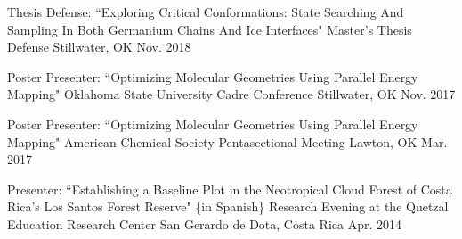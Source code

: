 

\begin{cventries}

  \cventry
    {Thesis Defense: ``Exploring Critical Conformations: State Searching And Sampling In Both Germanium Chains And Ice Interfaces"} %
    {Master's Thesis Defense} %
    {Stillwater, OK} %
    {Nov. 2018} %
    {
      \begin{cvitems} %
      \end{cvitems}
    }
	\vspace{-7.0mm}

\cventry
{Poster Presenter: ``Optimizing Molecular Geometries Using Parallel Energy Mapping"} %
{Oklahoma State University Cadre Conference} %
{Stillwater, OK} %
{Nov. 2017} %
{
	\begin{cvitems} %
	\end{cvitems}
}
\vspace{-7.0mm}

 \cventry
	{Poster Presenter: ``Optimizing Molecular Geometries Using Parallel Energy Mapping"} %
	{American Chemical Society Pentasectional Meeting} %
	{Lawton, OK} %
	{Mar. 2017} %
	{
		\begin{cvitems} %
		\end{cvitems}
	}
	\vspace{-9.0mm}

  \cventry
    {Presenter: ``Establishing a Baseline Plot in the Neotropical Cloud Forest of Costa Rica’s Los Santos Forest Reserve" \{in Spanish\}} %
    {Research Evening at the Quetzal Education Research Center} %
    {San Gerardo de Dota, Costa Rica} %
    {Apr. 2014} %
    {
      \begin{cvitems} %
      \end{cvitems}
    }
	\vspace{-6.0mm}


\end{cventries}

